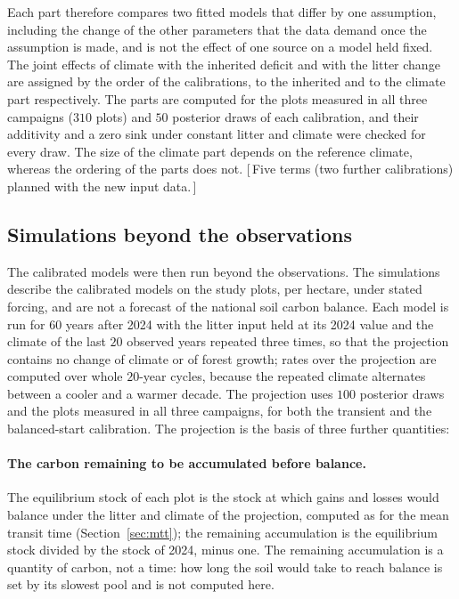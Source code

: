\documentclass[11pt]{article}
\newcommand{\gap}[1]{\textcolor{red!70!black}{\small[\,#1\,]}}
\begin{document}
Each part therefore compares two fitted models that
differ by one assumption, including the change of the other parameters that the data demand once
the assumption is made, and is not the effect of one source on a model held fixed. The joint effects
of climate with the inherited deficit and with the litter change are assigned by the order of the
calibrations, to the inherited and to the climate part respectively. The parts are computed for the
plots measured in all three campaigns ($310$ plots) and $50$ posterior draws of each calibration,
and their additivity and a zero sink under constant litter and climate were checked for every draw.
The size of the climate part depends on the reference climate, whereas the ordering of the parts
does not.
\gap{Five terms (two further calibrations) planned with the new input data.}

\subsection{Simulations beyond the observations}\label{sec:forward}

The calibrated models were then run beyond the observations. The simulations describe the
calibrated models on the study plots, per hectare, under stated forcing, and are not a forecast of
the national soil carbon balance.
Each model is run for $60$ years after 2024 with the litter input held
at its 2024 value and the climate of the last $20$ observed years repeated three times, so that the
projection contains no change of climate or of forest growth; rates over the projection are
computed over whole $20$-year cycles, because the repeated climate alternates between a cooler and a
warmer decade. The projection uses $100$ posterior draws and the plots measured in all three
campaigns, for both the transient and the balanced-start calibration. The projection is the basis of three further quantities:

\paragraph{The carbon remaining to be accumulated before balance.} The equilibrium stock of each plot is the stock at which gains
and losses would balance under the litter and climate of the projection, computed as for the mean
transit time (Section~\ref{sec:mtt}); the remaining accumulation is the equilibrium stock divided by
the stock of 2024, minus one. The remaining accumulation is a quantity of carbon, not a time: how
long the soil would take to reach balance is set by its slowest pool and is not computed here.
\end{document}
